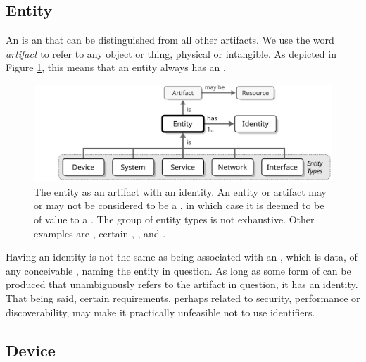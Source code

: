 \subsection{Entity}
\label{sec:reference-model:entity}

An  is an  that can be distinguished from all other artifacts.
We use the word \textit{artifact} to refer to any object or thing, physical or intangible.
As depicted in Figure \ref{fig:entity}, this means that an entity always has an .

\begin{figure}[ht!]
  \centering
  \includegraphics[scale=0.9]{figures/entity}
  \caption{
    The entity as an artifact with an identity.
    An entity or artifact may or may not be considered to be a , in which case it is deemed to be of value to a .
    The group of entity types is not exhaustive.
    Other examples are , certain , ,  and .
  }
  \label{fig:entity}
\end{figure}

\vspace*{1mm}

Having an identity is not the same as being associated with an , which is data, of any conceivable , naming the entity in question.
As long as some form of  can be produced that unambiguously refers to the artifact in question, it has an identity.
That being said, certain  requirements, perhaps related to security, performance or discoverability, may make it practically unfeasible not to use identifiers.

\subsection{Device}
\label{sec:reference-model:device}

